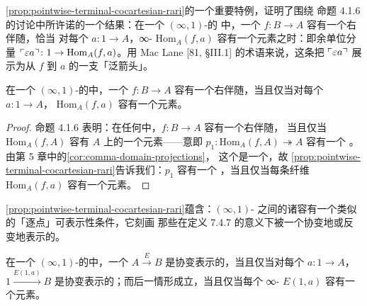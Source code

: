 \cref{prop:pointwise-terminal-cocartesian-rari}的一个重要特例，证明了围绕
命题 4.1.6 的讨论中所许诺的一个结果：在一个 $(\infty,1)$-\trCategory{}的%
\trInfinityCosmos{}中，一个\trFunctor{} $f\colon B\to A$ 容有一个右伴随，恰当
对每个\trElement{} $a\colon 1\to A$，∞-\trCategory{}
$\mathrm{Hom}_{A}(f,a)$ 容有一个\trTerminal{}元素之时：即余单位分量
$\ulcorner\varepsilon a\urcorner\colon 1\to\mathrm{Hom}_{A}(f,a)$。用 Mac Lane
[81, \S III.1] 的术语来说，这条\trUniversalProperty{}把 $\ulcorner\varepsilon a\urcorner$
展示为从\trFunctor{} $f$ 到\trElement{} $a$ 的一支「泛箭头」。

\begin{corollary}\label{cor:right-adjoint-terminal-elements}
在一个 $(\infty,1)$-\trCategory{}的\trInfinityCosmos{}中，一个\trFunctor{}
$f\colon B\to A$ 容有一个右伴随，当且仅当对每个\trElement{} $a\colon 1\to A$，
\trCommaInfinityCategory{} $\mathrm{Hom}_{A}(f,a)$ 容有一个\trTerminal{}元素。
\end{corollary}

\begin{proof}
命题 4.1.6 表明：在任何\trInfinityCosmos{}中，$f\colon B\to A$ 容有一个右伴随，
当且仅当 $\mathrm{Hom}_{A}(f,A)$ 容有 $A$ 上的一个\trTerminal{}元素——意即
$p_{1}\colon\mathrm{Hom}_{A}(f,A)\twoheadrightarrow A$ 容有一个%
\trRightAdjoint\trRightInverse。由第 5 章中的\cref{cor:comma-domain-projections}，
这个\trFunctor{}是一个\trCocartesianFibration，故%
\cref{prop:pointwise-terminal-cocartesian-rari}告诉我们：$p_{1}$ 容有一个%
\trRightAdjoint\trRightInverse，当且仅当每条纤维 $\mathrm{Hom}_{A}(f,a)$
容有一个\trTerminal{}元素。
\end{proof}

\cref{prop:pointwise-terminal-cocartesian-rari}蕴含：$(\infty,1)$-%
\trCategory{}之间的诸\trModule{}容有一个类似的「逐点」可表示性条件，它刻画
那些在定义 7.4.7 的意义下被一个\trFunctor{}协变地或反变地表示的\trModule。

\begin{corollary}\label{cor:pointwise-covariant-representability}
在一个 $(\infty,1)$-\trCategory{}的\trInfinityCosmos{}中，一个\trModule{}
$A\xrightarrow{E}B$ 是协变表示的，当且仅当对每个\trElement{} $a\colon 1\to A$，
\trModule{} $1\xrightarrow{E(1,a)}B$ 是协变表示的；而后一情形成立，当且仅当每个
∞-\trCategory{} $E(1,a)$ 容有一个\trTerminal{}元素。
\end{corollary}

